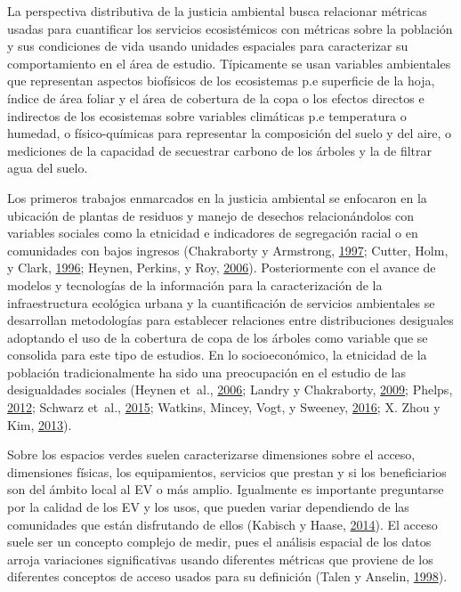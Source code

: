 \documentclass[12pt,a4paper,openany]{book}
\theoremstyle{definition}
\theoremstyle{definition}
\theoremstyle{definition}
\theoremstyle{remark}
\begin{document}
La perspectiva distributiva de la justicia ambiental busca relacionar
métricas usadas para cuantificar los servicios ecosistémicos con
métricas sobre la población y sus condiciones de vida usando unidades
espaciales para caracterizar su comportamiento en el área de estudio.
Típicamente se usan variables ambientales que representan aspectos
biofísicos de los ecosistemas p.e superficie de la hoja, índice de área
foliar y el área de cobertura de la copa o los efectos directos e
indirectos de los ecosistemas sobre variables climáticas p.e temperatura
o humedad, o físico-químicas para representar la composición del suelo y
del aire, o mediciones de la capacidad de secuestrar carbono de los
árboles y la de filtrar agua del suelo.

Los primeros trabajos enmarcados en la justicia ambiental se enfocaron
en la ubicación de plantas de residuos y manejo de desechos
relacionándolos con variables sociales como la etnicidad e indicadores
de segregación racial o en comunidades con bajos ingresos (Chakraborty y
Armstrong, \protect\hyperlink{ref-chakraborty1997exploring}{1997};
Cutter, Holm, y Clark, \protect\hyperlink{ref-cutter_role_1996}{1996};
Heynen, Perkins, y Roy,
\protect\hyperlink{ref-heynen_political_2006}{2006}). Posteriormente con
el avance de modelos y tecnologías de la información para la
caracterización de la infraestructura ecológica urbana y la
cuantificación de servicios ambientales se desarrollan metodologías para
establecer relaciones entre distribuciones desiguales adoptando el uso
de la cobertura de copa de los árboles como variable que se consolida
para este tipo de estudios. En lo socioeconómico, la etnicidad de la
población tradicionalmente ha sido una preocupación en el estudio de las
desigualdades sociales (Heynen et~al.,
\protect\hyperlink{ref-heynen_political_2006}{2006}; Landry y
Chakraborty, \protect\hyperlink{ref-landry_street_2009}{2009}; Phelps,
\protect\hyperlink{ref-phelps_association_2012}{2012}; Schwarz et~al.,
\protect\hyperlink{ref-schwarz_trees_2015}{2015}; Watkins, Mincey, Vogt,
y Sweeney, \protect\hyperlink{ref-watkins_is_2016}{2016}; X. Zhou y Kim,
\protect\hyperlink{ref-zhou_social_2013}{2013}).

Sobre los espacios verdes suelen caracterizarse dimensiones sobre el
acceso, dimensiones físicas, los equipamientos, servicios que prestan y
si los beneficiarios son del ámbito local al EV o más amplio. Igualmente
es importante preguntarse por la calidad de los EV y los usos, que
pueden variar dependiendo de las comunidades que están disfrutando de
ellos (Kabisch y Haase,
\protect\hyperlink{ref-kabisch_green_2014}{2014}). El acceso suele ser
un concepto complejo de medir, pues el análisis espacial de los datos
arroja variaciones significativas usando diferentes métricas que
proviene de los diferentes conceptos de acceso usados para su definición
(Talen y Anselin, \protect\hyperlink{ref-talen_assessing_1998}{1998}).
\end{document}
